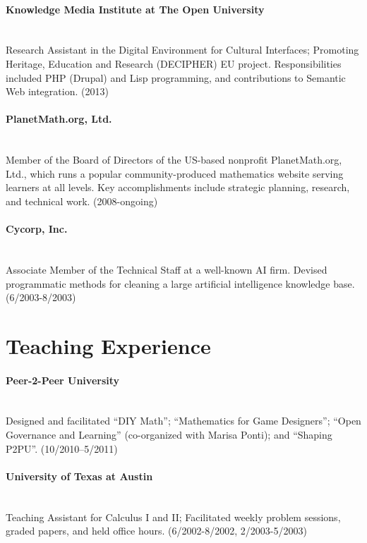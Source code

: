\documentclass[12pt,article]{article}
\begin{document}
\paragraph{Knowledge Media Institute at The Open University} \hspace{.1in} \\
Research Assistant in the Digital Environment for Cultural
Interfaces; Promoting Heritage, Education and Research (DECIPHER) EU
project.  Responsibilities included PHP (Drupal) and Lisp programming,
and contributions to Semantic Web integration. (2013)

\paragraph{PlanetMath.org, Ltd.} \hspace{.1in} \\
Member of the Board of Directors of the US-based nonprofit
PlanetMath.org, Ltd., which runs a popular community-produced
mathematics website serving learners at all levels.  Key
accomplishments include strategic planning, research, and technical
work.  (2008-ongoing)

\paragraph{Cycorp, Inc.}  \hspace{.1in} \\
Associate Member of the Technical Staff at a well-known AI firm.
Devised programmatic methods for cleaning a large artificial
intelligence knowledge base. (6/2003-8/2003)

\section*{Teaching Experience}

\paragraph{Peer-2-Peer University} \hspace{.1in} \\
Designed and facilitated ``DIY Math''; ``Mathematics for
Game Designers''; ``Open Governance and Learning'' (co-organized with
Marisa Ponti); and ``Shaping P2PU''.  (10/2010--5/2011)

\paragraph{University of Texas at Austin} \hspace{.1in} \\
Teaching Assistant for Calculus I and II; Facilitated
weekly problem sessions, graded papers, and held office
hours. (6/2002-8/2002, 2/2003-5/2003)
\end{document}
